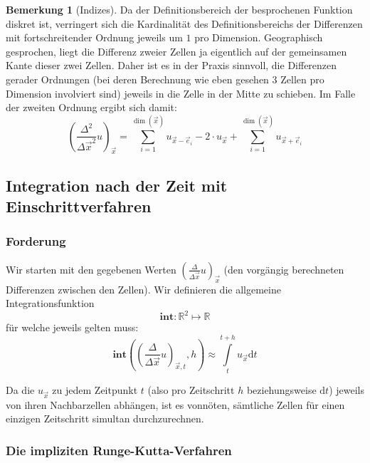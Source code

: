 \documentclass[11pt]{report} %
\theoremstyle{definition}
\newtheorem*{bemerkung}{Bemerkung}
\begin{document}
\begin{bemerkung}[Indizes]
Da der Definitionsbereich der besprochenen Funktion diskret ist, verringert sich die Kardinalität des Definitionsbereichs der Differenzen mit fortschreitender Ordnung jeweils um $1$ pro Dimension. Geographisch gesprochen, liegt die Differenz zweier Zellen ja eigentlich auf der gemeinsamen Kante dieser zwei Zellen. Daher ist es in der Praxis sinnvoll, die Differenzen gerader Ordnungen (bei deren Berechnung wie eben gesehen 3 Zellen pro Dimension involviert sind) jeweils in die Zelle in der Mitte zu schieben. Im Falle der zweiten Ordnung ergibt sich damit:
\begin{equation}
\left( \frac{\Delta^2}{\Delta \vec x^2} u\right)_{\vec x} =\sum\limits_{i=1}^{\dim(\vec x)} u_{\vec x - \vec e_i}  -2\cdot u_{\vec x} + \sum\limits_{i=1}^{\dim(\vec x)} u_{\vec x + \vec e_i}
\end{equation}
\end{bemerkung}

\subsection{Integration nach der Zeit mit Einschrittverfahren}

\newcommand{\intr}{\mathbf{int}}
\renewcommand{\d}{\mathrm{d}}
\newcommand{\duxt}{\left(\frac{\Delta}{\Delta \vec x}u \right)_{\vec x, t}}
\newcommand{\duxtp}[1]{\left(\frac{\Delta}{\Delta \vec x}u \right)_{\vec x, t + #1 h}}

\subsubsection{Forderung}

Wir starten mit den gegebenen Werten $\left(\frac{\Delta}{\Delta \vec x}u \right)_{\vec x}$ (den vorgängig berechneten Differenzen zwischen den Zellen). Wir definieren die allgemeine Integrationsfunktion
\[
\intr :  \mathbb{R}^2 \mapsto \mathbb{R}
\]
für welche jeweils gelten muss:
\[
\intr\left(\duxt, h \right) \approx \int\limits_t^{t+h} u_{\vec x} \d t
\]

Da die $u_{\vec x}$ zu jedem Zeitpunkt $t$ (also pro Zeitschritt $h$ beziehungsweise $\d t$) jeweils von ihren Nachbarzellen abhängen, ist es vonnöten, sämtliche Zellen für einen einzigen Zeitschritt simultan durchzurechnen.

\subsubsection{Die impliziten Runge-Kutta-Verfahren}
\end{document}
